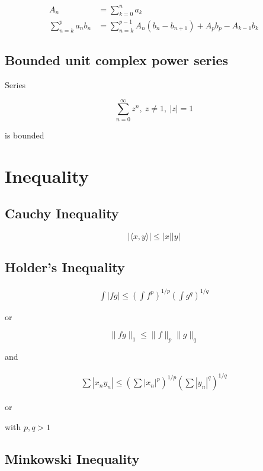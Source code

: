 \documentclass[11pt,a4paper]{article}
\begin{document}
\begin{align*}
    A_n &= \sum_{k=0}^{n}a_k \\
    \sum_{n=k}^{p} a_nb_n &= \sum_{n=k}^{p-1}A_n(b_n - b_{n+1}) + A_pb_p - A_{k-1}b_k
\end{align*}

\subsection{Bounded unit complex power series}

Series

\[
    \sum_{n=0}^{\infty} z^n ,\: z \ne 1,\: \lvert z\rvert = 1
\]

is bounded

\section{Inequality}

\subsection{Cauchy Inequality}

\[
    \lvert \langle x, y \rangle \rvert \le \lvert x \rvert \lvert y \rvert
\]


\subsection{Holder's Inequality}

\begin{align*}
    \int |fg| \le \left(\int f^p\right)^{1/p} \left(\int g^q\right)^{1/q}
\end{align*}


or

\[
    \| fg \|_1 \le \| f \|_p \| g \|_q
\]

and

\begin{align*}
    \sum |x_n y_n| \le \left(\sum \left|x_n \right|^p\right)^{1/p}  \left(\sum \left|y_n \right|^q\right)^{1/q}
\end{align*}

or



with $p,q > 1$

\subsection{Minkowski Inequality}
\end{document}
